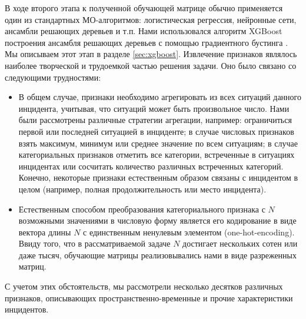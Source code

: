В ходе второго этапа к полученной обучающей матрице обычно применяется один из стандартных МО-алгоритмов: логистическая регрессия, нейронные сети, ансамбли решающих деревьев и т.п. Нами использовался алгоритм XGBoost построения ансамбля решающих деревьев с помощью градиентного бустинга \cite{chen2016xgboost}. Мы описываем этот этап в разделе \ref{sec:xgboost}.
Извлечение признаков являлось наиболее творческой и трудоемкой частью решения задачи. Оно было связано со следующими трудностями:
\begin{itemize}
\item В общем случае, признаки необходимо агрегировать из всех ситуаций данного инцидента, учитывая, что ситуаций может быть произвольное число. Нами были рассмотрены различные стратегии агрегации, например: ограничиться первой или последней ситуацией в инциденте; в случае числовых признаков взять максимум, минимум или среднее значение по всем ситуациям; в случае категориальных признаков отметить все категории, встреченные в ситуациях инцидентах или сосчитать количество различных встреченных категорий. Конечно, некоторые признаки естественным образом связаны с инцидентом в целом (например, полная продолжительность или место инцидента).
\item Естественным способом преобразования категориального признака с $N$ возможными значениями в числовую форму является его кодирование в виде вектора длины $N$ с единственным ненулевым элементом (one-hot-encoding). Ввиду того, что в рассматриваемой задаче $N$ достигает нескольких сотен или даже тысяч,  обучающие матрицы реализовывались нами в виде разреженных матриц.
\end{itemize}
С учетом этих обстоятельств, мы рассмотрели несколько десятков различных признаков, описывающих пространственно-временные и прочие характеристики инцидентов.

